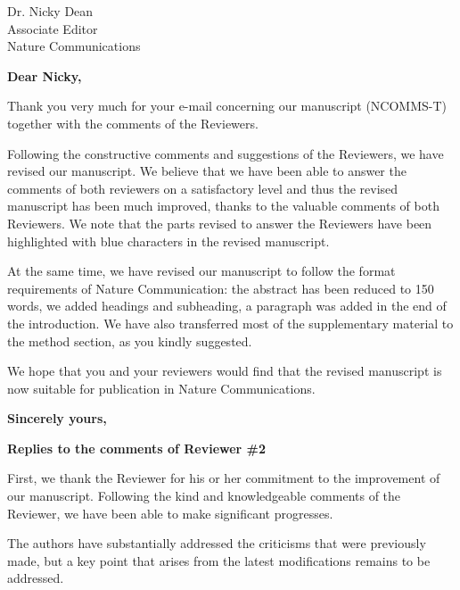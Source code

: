 \documentclass[a4paper, rebuttal, parskip=true, firsthead=false, fromemail=true, foldmarks=false]{scrlttr2}
\begin{document}
 
\begin{letter}{Dr. Nicky Dean\\
Associate Editor\\
Nature Communications}
\opening{\bf Dear Nicky,}

Thank you very much for your e-mail concerning our manuscript (NCOMMS\nobreakdash-T) together with the comments of the Reviewers. 

Following the constructive comments and suggestions of the Reviewers, we have revised our manuscript. 
We believe that we have been able to answer the comments of both reviewers on a satisfactory level and thus the revised manuscript has been much improved, thanks to the valuable comments of both Reviewers. We note that the parts revised to answer the Reviewers have been highlighted with blue characters in the revised manuscript.

At the same time, we have revised our manuscript to follow the format requirements of Nature Communication: the abstract has been reduced to 150 words, we added headings and subheading, a paragraph was added in the end of the introduction. We have also transferred most of the supplementary material to the method section, as you kindly suggested.


We hope that you and your reviewers would find that the revised manuscript is now suitable for publication in Nature Communications. 

\closing{\bf Sincerely yours,} 
\clearpage

\textsf{\textbf{Replies to the comments of Reviewer \#2}}

First, we thank the Reviewer for his or her commitment to the improvement of our manuscript. Following the kind and knowledgeable comments of the Reviewer, we have been able to make significant progresses.

\begin{quotationi}
The authors have substantially addressed the criticisms that were previously made, but a key point that arises from the latest modifications remains to be addressed.


\end{quotationi}
\end{letter}
\end{document}
